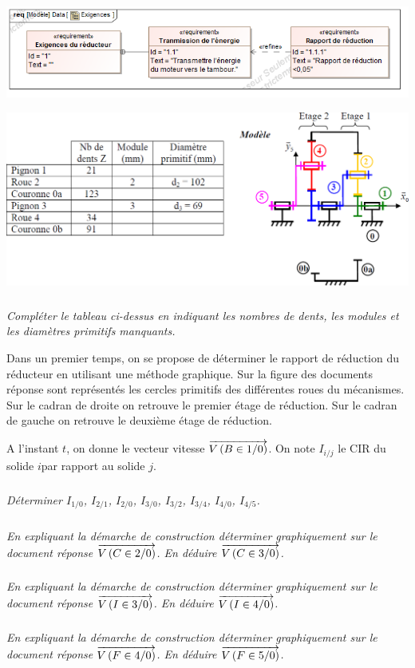 \documentclass[10pt,fleqn]{article} %
\begin{document}
\begin{center}
\includegraphics[width=.8\textwidth]{images/train_06}
\end{center}
\begin{center}
\includegraphics[width=.8\textwidth]{images/train_03}
\end{center}
\subparagraph{}
\textit{Compléter le tableau ci-dessus en indiquant les nombres de dents, les modules et les diamètres primitifs manquants.}


Dans un premier temps, on se propose de déterminer le rapport de réduction du réducteur en utilisant une méthode graphique. Sur la figure des documents réponse sont représentés les cercles primitifs des différentes roues du mécanismes. Sur le cadran de droite on retrouve le premier étage de réduction. Sur le cadran de gauche on retrouve le deuxième étage de réduction.

A l'instant $t$, on donne le vecteur vitesse $\overrightarrow{V\left( {B} \in {1}/{0}\right)}$. On note $I_{i/j}$ le CIR du solide $i$par rapport au solide $j$.

\subparagraph{}
\textit{Déterminer $I_{1/0}$, $I_{2/1}$, $I_{2/0}$, $I_{3/0}$, $I_{3/2}$, $I_{3/4}$, $I_{4/0}$, $I_{4/5}$.}


\subparagraph{}
\textit{En expliquant la démarche de construction déterminer graphiquement sur le document réponse $\overrightarrow{V\left( {C} \in {2}/{0}\right)}$. En déduire $\overrightarrow{V\left( {C} \in {3}/{0}\right)}$.}

\subparagraph{}
\textit{En expliquant la démarche de construction déterminer graphiquement sur le document réponse $\overrightarrow{V\left( {I} \in {3}/{0}\right)}$. En déduire $\overrightarrow{V\left( {I} \in {4}/{0}\right)}$.}

\subparagraph{}
\textit{En expliquant la démarche de construction déterminer graphiquement sur le document réponse $\overrightarrow{V\left( {F} \in {4}/{0}\right)}$. En déduire $\overrightarrow{V\left( {F} \in {5}/{0}\right)}$.}
\end{document}
